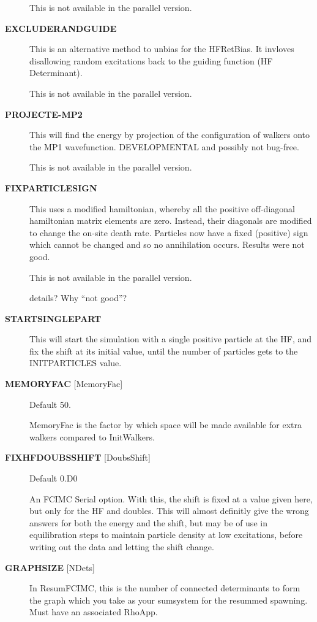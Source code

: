 \documentclass[openany,a4paper,10pt]{manual}
\begin{document}
\begin{description}
This is not available in the parallel version.

\item[\textbf{EXCLUDERANDGUIDE}]
This is an alternative method to unbias for the HFRetBias. It invloves
disallowing random excitations back to the guiding function (HF
Determinant).

This is not available in the parallel version.

\item[\textbf{PROJECTE-MP2}]
This will find the energy by projection of the configuration of walkers
onto the MP1 wavefunction.  DEVELOPMENTAL and possibly not bug-free.

This is not available in the parallel version.

\item[\textbf{FIXPARTICLESIGN}]
This uses a modified hamiltonian, whereby all the positive off-diagonal
hamiltonian matrix elements are zero. Instead, their diagonals are modified
to change the on-site death rate. Particles now have a fixed (positive)
sign which cannot be changed and so no annihilation occurs.  Results were
not good.

This is not available in the parallel version.

\begin{notice}[note]
details?  Why ``not good''?
\end{notice}

\item[\textbf{STARTSINGLEPART}]
This will start the simulation with a single positive particle at the HF,
and fix the shift at its initial value, until the number of particles gets
to the INITPARTICLES value.

\item[\textbf{MEMORYFAC} {[}MemoryFac{]}]
Default 50.

MemoryFac is the factor by which space will be made available for extra
walkers compared to InitWalkers.

\item[\textbf{FIXHFDOUBSSHIFT} {[}DoubsShift{]}]
Default 0.D0

An FCIMC Serial option. With this, the shift is fixed at a value given here,
but only for the HF and doubles. This will almost definitly give the wrong
answers for both the energy and the shift, but may be of use in equilibration
steps to maintain particle density at low excitations, before writing out the
data and letting the shift change.

\item[\textbf{GRAPHSIZE} {[}NDets{]}]
In ResumFCIMC, this is the number of connected determinants to form the
graph which you take as your sumsystem for the resummed spawning.  Must
have an associated RhoApp.


\end{description}
\end{document}
